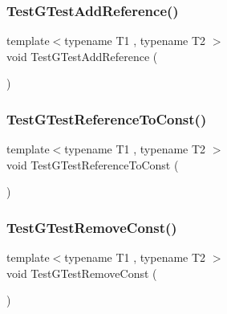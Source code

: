 \subsubsection{\texorpdfstring{TestGTestAddReference()}{TestGTestAddReference()}}
{\footnotesize\ttfamily template$<$typename T1 , typename T2 $>$ \\
void Test\+G\+Test\+Add\+Reference (\begin{DoxyParamCaption}{ }\end{DoxyParamCaption})}

\mbox{\label{_obj__test_2lib_2googletest-release-1_88_81_2googletest_2test_2gtest__unittest_8cc_a033ae0af50f62e72a31bf1a28151bd65}} 
\subsubsection{\texorpdfstring{TestGTestReferenceToConst()}{TestGTestReferenceToConst()}}
{\footnotesize\ttfamily template$<$typename T1 , typename T2 $>$ \\
void Test\+G\+Test\+Reference\+To\+Const (\begin{DoxyParamCaption}{ }\end{DoxyParamCaption})}

\mbox{\label{_obj__test_2lib_2googletest-release-1_88_81_2googletest_2test_2gtest__unittest_8cc_a925cffc2731cce684bfcd82858eac00b}} 
\subsubsection{\texorpdfstring{TestGTestRemoveConst()}{TestGTestRemoveConst()}}
{\footnotesize\ttfamily template$<$typename T1 , typename T2 $>$ \\
void Test\+G\+Test\+Remove\+Const (\begin{DoxyParamCaption}{ }\end{DoxyParamCaption})}

